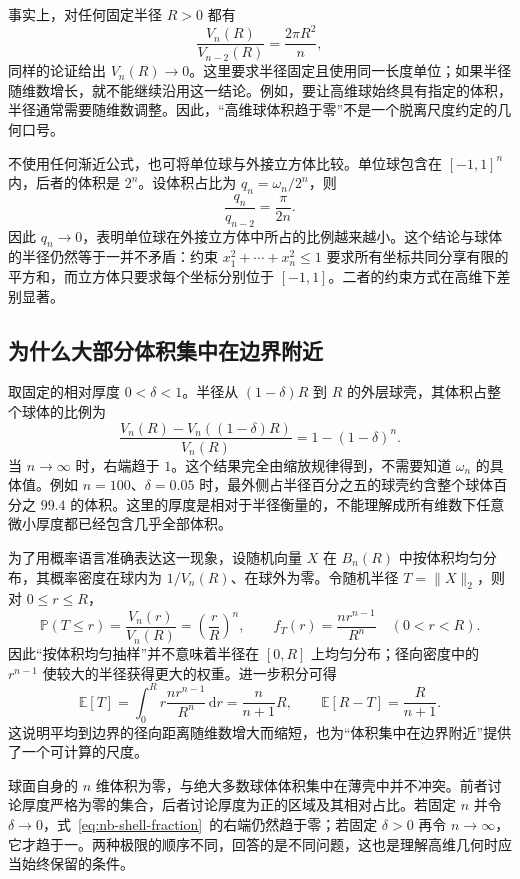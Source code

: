 \documentclass[UTF8,12pt,a4paper,fontset=fandol]{ctexart}
\begin{document}
事实上，对任何固定半径 $R>0$ 都有
\[
  \frac{V_n(R)}{V_{n-2}(R)}=\frac{2\pi R^2}{n},
\]
同样的论证给出 $V_n(R)\to0$。这里要求半径固定且使用同一长度单位；如果半径随维数增长，就不能继续沿用这一结论。例如，要让高维球始终具有指定的体积，半径通常需要随维数调整。因此，“高维球体积趋于零”不是一个脱离尺度约定的几何口号。

不使用任何渐近公式，也可将单位球与外接立方体比较。单位球包含在 $[-1,1]^n$ 内，后者的体积是 $2^n$。设体积占比为 $q_n=\omega_n/2^n$，则
\[
  \frac{q_n}{q_{n-2}}=\frac{\pi}{2n}.
\]
因此 $q_n\to0$，表明单位球在外接立方体中所占的比例越来越小。这个结论与球体的半径仍然等于一并不矛盾：约束 $x_1^2+\cdots+x_n^2\leq1$ 要求所有坐标共同分享有限的平方和，而立方体只要求每个坐标分别位于 $[-1,1]$。二者的约束方式在高维下差别显著。

\subsection{为什么大部分体积集中在边界附近}

取固定的相对厚度 $0<\delta<1$。半径从 $(1-\delta)R$ 到 $R$ 的外层球壳，其体积占整个球体的比例为
\begin{equation}\label{eq:nb-shell-fraction}
  \frac{V_n(R)-V_n((1-\delta)R)}{V_n(R)}
  =1-(1-\delta)^n.
\end{equation}
当 $n\to\infty$ 时，右端趋于 $1$。这个结果完全由缩放规律得到，不需要知道 $\omega_n$ 的具体值。例如 $n=100$、$\delta=0.05$ 时，最外侧占半径百分之五的球壳约含整个球体百分之 $99.4$ 的体积。这里的厚度是相对于半径衡量的，不能理解成所有维数下任意微小厚度都已经包含几乎全部体积。

为了用概率语言准确表达这一现象，设随机向量 $X$ 在 $B_n(R)$ 中按体积均匀分布，其概率密度在球内为 $1/V_n(R)$、在球外为零。令随机半径 $T=\|X\|_2$，则对 $0\leq r\leq R$，
\[
  \mathbb P(T\leq r)=\frac{V_n(r)}{V_n(R)}
  =\left(\frac rR\right)^n,
  \qquad f_T(r)=\frac{nr^{n-1}}{R^n}\quad(0<r<R).
\]
因此“按体积均匀抽样”并不意味着半径在 $[0,R]$ 上均匀分布；径向密度中的 $r^{n-1}$ 使较大的半径获得更大的权重。进一步积分可得
\[
  \mathbb E[T]=\int_0^Rr\frac{nr^{n-1}}{R^n}\,\mathrm dr
  =\frac{n}{n+1}R,\qquad
  \mathbb E[R-T]=\frac{R}{n+1}.
\]
这说明平均到边界的径向距离随维数增大而缩短，也为“体积集中在边界附近”提供了一个可计算的尺度。

球面自身的 $n$ 维体积为零，与绝大多数球体体积集中在薄壳中并不冲突。前者讨论厚度严格为零的集合，后者讨论厚度为正的区域及其相对占比。若固定 $n$ 并令 $\delta\to0$，式~\eqref{eq:nb-shell-fraction}~的右端仍然趋于零；若固定 $\delta>0$ 再令 $n\to\infty$，它才趋于一。两种极限的顺序不同，回答的是不同问题，这也是理解高维几何时应当始终保留的条件。
\end{document}
